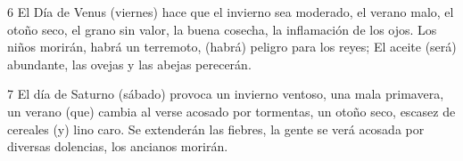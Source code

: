 \par 6 El Día de Venus (viernes) hace que el invierno sea moderado, el verano malo, el otoño seco, el grano sin valor, la buena cosecha, la inflamación de los ojos. Los niños morirán, habrá un terremoto, (habrá) peligro para los reyes; El aceite (será) abundante, las ovejas y las abejas perecerán.

\par 7 El día de Saturno (sábado) provoca un invierno ventoso, una mala primavera, un verano (que) cambia al verse acosado por tormentas, un otoño seco, escasez de cereales (y) lino caro. Se extenderán las fiebres, la gente se verá acosada por diversas dolencias, los ancianos morirán.


